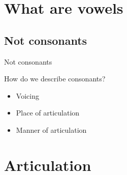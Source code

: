 \documentclass{beamer}
\subtitle[Vowel Articulation]{Articulation of English Vowels}
\newcommand{\suboneone}{Not consonants}
\begin{document}
  

  \section{What are vowels}
    \subsection{\suboneone}
      \begin{frame}{\suboneone}
        \begin{block}{How do we describe consonants?}
          \begin{itemize}
            \item<2-3> Voicing 
            \item<2-3> Place of articulation 
            \item<2-3> Manner of articulation 
          \end{itemize}
        \end{block}
      \end{frame}

  \section{Articulation}
\end{document}

